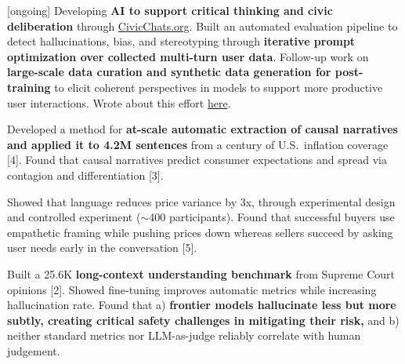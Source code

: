 \documentclass[11pt,letterpaper]{article}
\begin{document}
\begin{cvitems}
    \item {[ongoing]} Developing \textbf{AI to support critical thinking and civic deliberation} through \href{https://civicchats.org}{CivicChats.org}. Built an automated evaluation pipeline to detect hallucinations, bias, and stereotyping through \textbf{iterative prompt optimization over collected multi-turn user data}. Follow-up work on \textbf{large-scale data curation and synthetic data generation for post-training} to elicit coherent perspectives in models to support more productive user interactions. Wrote about this effort \href{https://open.substack.com/pub/cichicago/p/civicchats-building-ai-to-support}{here}.
    \item Developed a method for \textbf{at-scale automatic extraction of causal narratives and applied it to 4.2M sentences} from a century of U.S.\ inflation coverage [4]. Found that causal narratives predict consumer expectations and spread via contagion and differentiation [3].
    \item Showed that language reduces price variance by 3x, through experimental design and controlled experiment ($\sim$400 participants). Found that successful buyers use empathetic framing while pushing prices down whereas sellers succeed by asking user needs early in the conversation [5].
    \item Built a 25.6K \textbf{long-context understanding benchmark} from Supreme Court opinions [2]. Showed fine-tuning improves automatic metrics while increasing hallucination rate. Found that a) \textbf{frontier models hallucinate less but more subtly, creating critical safety challenges in mitigating their risk,} and b) neither standard metrics nor LLM-as-judge reliably correlate with human judgement.
    
    
\end{cvitems}
\end{document}
